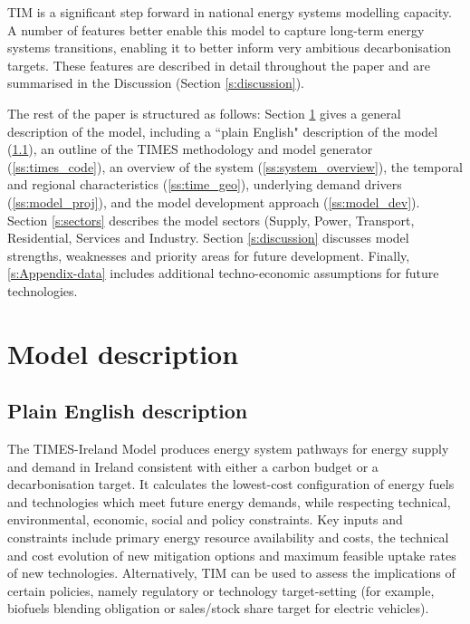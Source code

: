 \documentclass[journal abbreviation, manuscript]{copernicus}
\begin{document}
TIM is a significant step forward in national energy systems modelling capacity. A number of features better enable this model to capture long-term energy systems transitions, enabling it to better inform very ambitious decarbonisation targets. These features are described in detail throughout the paper and are summarised in the Discussion (Section \ref{s:discussion}).


The rest of the paper is structured as follows: Section \ref{S:model_desc} gives a general description of the model, including a ``plain English" description of the model (\ref{ss:model_plain}), an outline of the TIMES methodology and model generator (\ref{ss:times_code}), an overview of the system (\ref{ss:system_overview}), the temporal and regional characteristics (\ref{ss:time_geo}), underlying demand drivers (\ref{ss:model_proj}), and the model development approach (\ref{ss:model_dev}). Section \ref{s:sectors} describes the model sectors (Supply, Power, Transport, Residential, Services and Industry. Section \ref{s:discussion} discusses model strengths, weaknesses and priority areas for future development. Finally, \ref{s:Appendix-data} includes additional techno-economic assumptions for future technologies. 

\section{Model description}
\label{S:model_desc}

\subsection{Plain English description}
\label{ss:model_plain}
The TIMES-Ireland Model produces energy system pathways for energy supply and demand in Ireland consistent with either a carbon budget or a decarbonisation target. It calculates the lowest-cost configuration of energy fuels and technologies which meet future energy demands, while respecting technical, environmental, economic, social and policy constraints. Key inputs and constraints include primary energy resource availability and costs, the technical and cost evolution of new mitigation options and maximum feasible uptake rates of new technologies. Alternatively, TIM can be used to assess the implications of certain policies, namely regulatory or technology target-setting (for example, biofuels blending obligation or sales/stock share target for electric vehicles).
\end{document}
